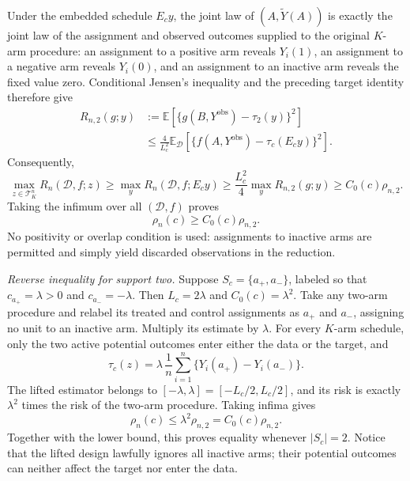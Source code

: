Under the embedded schedule \(E_cy\), the joint law of \((A,\widetilde Y(A))\) is exactly the joint law of the assignment and observed outcomes supplied to the original \(K\)-arm procedure: an assignment to a positive arm reveals \(Y_i(1)\), an assignment to a negative arm reveals \(Y_i(0)\), and an assignment to an inactive arm reveals the fixed value zero. Conditional Jensen's inequality and the preceding target identity therefore give
\[
\begin{aligned}
R_{n,2}(g;y)
&:=\mathbb E\left[\{g(B,Y^{\mathrm{obs}})-\tau_2(y)\}^2\right]\\
&\le \frac{4}{L_c^2}
\mathbb E_{\mathcal D}\left[
\{f(A,Y^{\mathrm{obs}})-\tau_c(E_cy)\}^2
\right].
\end{aligned}
\]
Consequently,
\[
\max_{z\in\mathcal T_K^n}R_n(\mathcal D,f;z)
\ge \max_y R_n(\mathcal D,f;E_cy)
\ge \frac{L_c^2}{4}\max_y R_{n,2}(g;y)
\ge C_0(c)\rho_{n,2}.
\]
Taking the infimum over all \((\mathcal D,f)\) proves
\[
\rho_n(c)\ge C_0(c)\rho_{n,2}.
\]
No positivity or overlap condition is used: assignments to inactive arms are permitted and simply yield discarded observations in the reduction.

\emph{Reverse inequality for support two.}
Suppose \(S_c=\{a_+,a_-\}\), labeled so that \(c_{a_+}=\lambda>0\) and \(c_{a_-}=-\lambda\). Then \(L_c=2\lambda\) and \(C_0(c)=\lambda^2\). Take any two-arm procedure and relabel its treated and control assignments as \(a_+\) and \(a_-\), assigning no unit to an inactive arm. Multiply its estimate by \(\lambda\). For every \(K\)-arm schedule, only the two active potential outcomes enter either the data or the target, and
\[
\tau_c(z)=\lambda\,\frac1n\sum_{i=1}^n
\{Y_i(a_+)-Y_i(a_-)\}.
\]
The lifted estimator belongs to \([-\lambda,\lambda]=[-L_c/2,L_c/2]\), and its risk is exactly \(\lambda^2\) times the risk of the two-arm procedure. Taking infima gives
\[
\rho_n(c)\le \lambda^2\rho_{n,2}=C_0(c)\rho_{n,2}.
\]
Together with the lower bound, this proves equality whenever \(|S_c|=2\). Notice that the lifted design lawfully ignores all inactive arms; their potential outcomes can neither affect the target nor enter the data.

